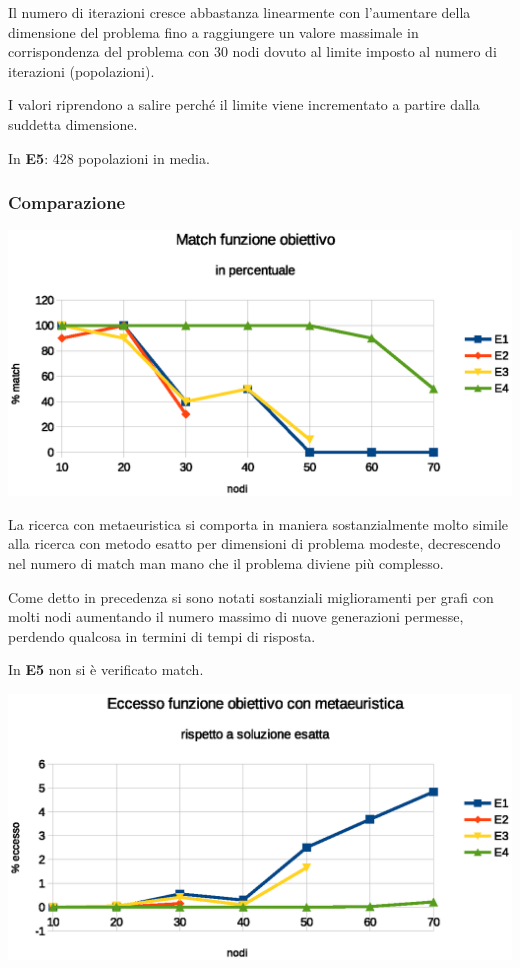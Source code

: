 \documentclass[a4paper]{article}
\begin{document}
                    Il numero di iterazioni cresce abbastanza linearmente con l'aumentare della dimensione del problema fino a raggiungere un valore massimale in corrispondenza del problema con 30 nodi
                    dovuto al limite imposto al numero di iterazioni (popolazioni).

                    I valori riprendono a salire perch\'e il limite viene incrementato a partire dalla suddetta dimensione.  

                    In \textbf{E5}: 428 popolazioni in media.

                \subsubsection{Comparazione}

                    \includegraphics[scale=0.7]{img/match}

                    La ricerca con metaeuristica si comporta in maniera sostanzialmente molto simile alla ricerca con metodo esatto per dimensioni di problema modeste,
                    decrescendo nel numero di match man mano che il problema diviene pi\`u complesso.
                    
                    Come detto in precedenza si sono notati sostanziali miglioramenti per grafi con molti nodi aumentando il numero massimo di nuove generazioni permesse, perdendo qualcosa
                    in termini di tempi di risposta.

                    In \textbf{E5} non si \`e verificato match.

                    \includegraphics[scale=0.7]{img/excess}
\end{document}
